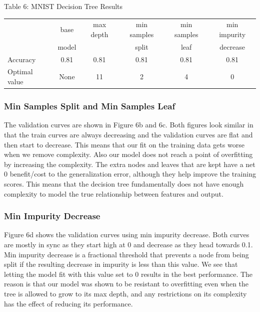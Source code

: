 \documentclass{article}
\begin{document}
\begin{table}
	
	\centering
	Table 6: MNIST Decision Tree Results \\
	\begin{tabular}{ l c c c c c }
		\hline
		& base & max depth & min samples & min samples & min impurity\\
		& model & & split & leaf & decrease \\
		\hline
		Accuracy & 0.81 & 0.81 & 0.81 & 0.81 & 0.81 \\
		Optimal value & None & 11 & 2 & 4 & 0 \\
		
		
		\hline 
	\end{tabular}
\end{table}

\subsubsection*{Min Samples Split and Min Samples Leaf}
The validation curves are shown in Figure 6b and 6c. Both figures look similar in that the train curves are always decreasing and the validation curves are flat and then start to decrease. This means that our fit on the training data gets worse when we remove complexity. Also our model does not reach a point of overfitting by increasing the complexity. The extra nodes and leaves that are kept have a net 0 benefit/cost to the generalization error, although they help improve the training scores. This means that the decision tree fundamentally does not have enough complexity to model the true relationship between features and output. 

\subsubsection*{Min Impurity Decrease}
Figure 6d shows the validation curves using min impurity decrease. Both curves are mostly in sync as they start high at 0 and decrease as they head towards 0.1. Min impurity decrease is a fractional threshold that prevents a node from being split if the resulting decrease in impurity is less than this value. We see that letting the model fit with this value set to 0 results in the best performance. The reason is that our model was shown to be resistant to overfitting even when the tree is allowed to grow to its max depth, and any restrictions on its complexity has the effect of reducing its performance. 
\end{document}
